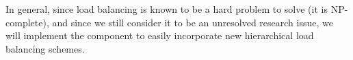 \documentclass[10pt]{article}
\begin{document}
In general, since load balancing is known to be a hard problem to
solve (it is NP-complete), and since we still consider it to be an
unresolved research issue, we will implement the 
component to easily incorporate new hierarchical load balancing
schemes.



%      
% 
% 
\end{document}
